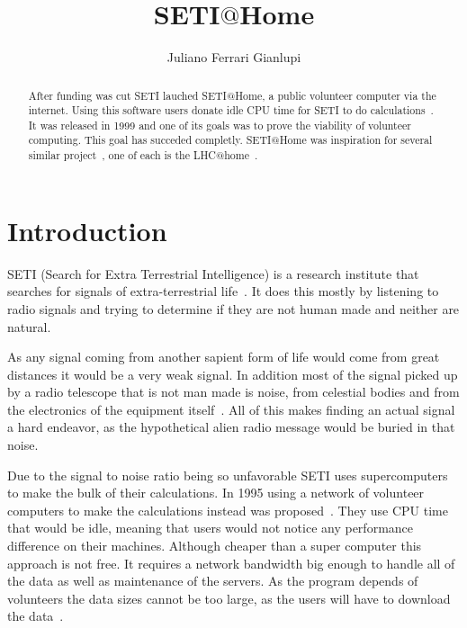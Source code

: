 
\title{SETI$@$Home}

\author{Juliano Ferrari Gianlupi}


\renewcommand{\shortauthors}{J. F. Gianlupi}


\begin{abstract}
After funding was cut SETI lauched SETI$@$Home, a public volunteer computer 
via the internet. Using this software users donate idle CPU time for SETI to do 
calculations~\cite{hid-sp18-601-www-sathome-about}. It was released in 1999 and 
one of its goals was to prove the viability of volunteer computing. This goal 
has succeded completly. SETI$@$Home was inspiration for several similar
project~\cite{hid-sp18-601-www-boinc-projects}, one of each is the 
 LHC$@$home~\cite{hid-sp18-601-www-lhc-at-home-history}.
\end{abstract}



\maketitle

\section{Introduction}\label{hid-sp18-601-section-introduction}
SETI (Search for Extra Terrestrial Intelligence) is a research institute that 
searches for signals of extra-terrestrial 
life~\cite{hid-sp18-601-paper-cocconi1959searching}. It does this mostly by 
listening to radio signals and trying to determine if they are not human made 
and neither are natural. 

As any signal coming from another sapient form of life would come from great 
distances it would be a very weak signal. In addition most of the signal picked 
up by a radio telescope that is not man made is noise, from celestial bodies 
and from the electronics of the equipment 
itself~\cite{hid-sp18-601-paper-anderson2002seti}. All of this makes finding an 
actual signal a hard endeavor, as the hypothetical alien radio message would be 
buried in that noise.

Due to the signal to noise ratio being so unfavorable SETI uses supercomputers 
to make the bulk of their calculations. In 1995 using a network of volunteer 
computers to make the calculations instead was 
proposed~\cite{hid-sp18-601-book-foster1999carl}. They use CPU time that would
be idle, meaning that users would not notice any performance difference on 
their machines. Although cheaper than a super computer this approach is 
not free. It requires a network bandwidth big enough
to handle all of the data as well as maintenance of the servers. As the 
program depends of volunteers the data sizes cannot be too large, as the users
will have to download the data~\cite{hid-sp18-601-paper-anderson2002seti}.

